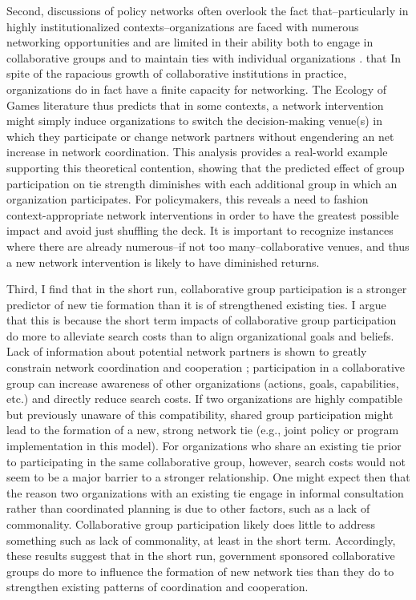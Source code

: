 \documentclass[12pt,a4paper,titlepage]{article}
\begin{document}
Second, discussions of policy networks often overlook the fact that--particularly in highly institutionalized contexts--organizations are faced with numerous networking opportunities and are limited in their ability both to engage in collaborative groups and to maintain ties with individual organizations \textcite{lubell2010, lubell2011-a}. that In spite of the rapacious growth of collaborative institutions in practice, organizations do in fact have a finite capacity for networking. The Ecology of Games literature \parencite[e.g.,][]{berardo2010,lubell2010,lubell2011, lubell2011-a, mcallister2014, smaldino2014, niles2012} thus predicts that in some contexts, a network intervention might simply induce organizations to switch the decision-making venue(s) in which they participate or change network partners without engendering an net increase in network coordination. This analysis provides a real-world example supporting this theoretical contention, showing that the predicted effect of group participation on tie strength diminishes with each additional group in which an organization participates. For policymakers, this reveals a need to fashion context-appropriate network interventions in order to have the greatest possible impact and avoid just shuffling the deck. It is important to recognize instances where there are already numerous--if not too many--collaborative venues, and thus a new network intervention is likely to have diminished returns. 

Third, I find that in the short run, collaborative group participation is a stronger predictor of new tie formation than it is of strengthened existing ties. I argue that this is because the short term impacts of collaborative group participation do more to alleviate search costs than to align organizational goals and beliefs. Lack of information about potential network partners is shown to greatly constrain network coordination and cooperation \parencite{scholz2008}; participation in a collaborative group can increase awareness of other organizations (actions, goals, capabilities, etc.) and directly reduce search costs. If two organizations are highly compatible but previously unaware of this compatibility, shared group participation might lead to the formation of a new, strong network tie (e.g., joint policy or program implementation in this model). For organizations who share an existing tie prior to participating in the same collaborative group, however, search costs would not seem to be a major barrier to a stronger relationship. One might expect then that the reason two organizations with an existing tie engage in informal consultation rather than coordinated planning is due to other factors, such as a lack of commonality. Collaborative group participation likely does little to address something such as lack of commonality, at least in the short term. Accordingly, these results suggest that in the short run, government sponsored collaborative groups do more to influence the formation of new network ties than they do to strengthen existing patterns of coordination and cooperation. 
\end{document}
